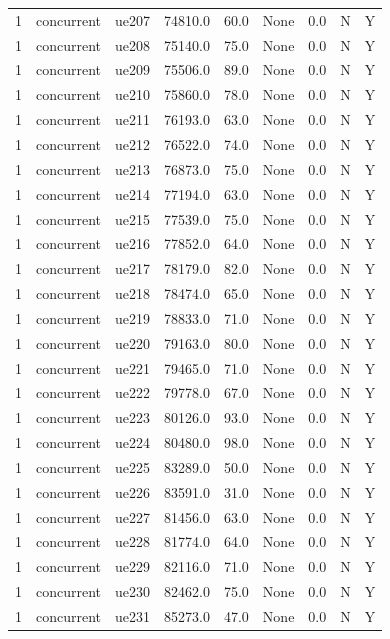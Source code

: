 \begin{table}[ht]
\begin{tabular}{|c|c|c|c|c|c|c|c|c|}
1 & concurrent & ue207 & 74810.0 & 60.0 & None & 0.0 & N & Y \\
1 & concurrent & ue208 & 75140.0 & 75.0 & None & 0.0 & N & Y \\
1 & concurrent & ue209 & 75506.0 & 89.0 & None & 0.0 & N & Y \\
1 & concurrent & ue210 & 75860.0 & 78.0 & None & 0.0 & N & Y \\
1 & concurrent & ue211 & 76193.0 & 63.0 & None & 0.0 & N & Y \\
1 & concurrent & ue212 & 76522.0 & 74.0 & None & 0.0 & N & Y \\
1 & concurrent & ue213 & 76873.0 & 75.0 & None & 0.0 & N & Y \\
1 & concurrent & ue214 & 77194.0 & 63.0 & None & 0.0 & N & Y \\
1 & concurrent & ue215 & 77539.0 & 75.0 & None & 0.0 & N & Y \\
1 & concurrent & ue216 & 77852.0 & 64.0 & None & 0.0 & N & Y \\
1 & concurrent & ue217 & 78179.0 & 82.0 & None & 0.0 & N & Y \\
1 & concurrent & ue218 & 78474.0 & 65.0 & None & 0.0 & N & Y \\
1 & concurrent & ue219 & 78833.0 & 71.0 & None & 0.0 & N & Y \\
1 & concurrent & ue220 & 79163.0 & 80.0 & None & 0.0 & N & Y \\
1 & concurrent & ue221 & 79465.0 & 71.0 & None & 0.0 & N & Y \\
1 & concurrent & ue222 & 79778.0 & 67.0 & None & 0.0 & N & Y \\
1 & concurrent & ue223 & 80126.0 & 93.0 & None & 0.0 & N & Y \\
1 & concurrent & ue224 & 80480.0 & 98.0 & None & 0.0 & N & Y \\
1 & concurrent & ue225 & 83289.0 & 50.0 & None & 0.0 & N & Y \\
1 & concurrent & ue226 & 83591.0 & 31.0 & None & 0.0 & N & Y \\
1 & concurrent & ue227 & 81456.0 & 63.0 & None & 0.0 & N & Y \\
1 & concurrent & ue228 & 81774.0 & 64.0 & None & 0.0 & N & Y \\
1 & concurrent & ue229 & 82116.0 & 71.0 & None & 0.0 & N & Y \\
1 & concurrent & ue230 & 82462.0 & 75.0 & None & 0.0 & N & Y \\
1 & concurrent & ue231 & 85273.0 & 47.0 & None & 0.0 & N & Y \\

\end{tabular}
\end{table}
